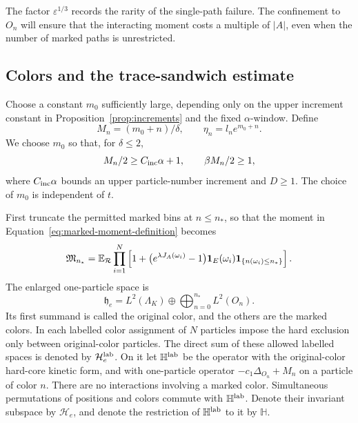 The factor $\varepsilon^{1/3}$ records the rarity of the
single-path failure.  The confinement to $O_n$ will ensure
that the interacting moment costs a multiple of $|A|$,
even when the number of marked paths is unrestricted.

\subsection{Colors and the trace-sandwich estimate}

Choose a constant $m_0$ sufficiently large, depending only
on the upper increment constant in Proposition~\ref{prop:increments}
and the fixed $\alpha$-window.  Define
\begin{equation}\label{eq:color-gaps}
 M_n=(m_0+n)/\delta,\qquad \eta_n=l_n e^{m_0+n}.
\end{equation}
We choose $m_0$ so that, for $\delta\le2$,
\begin{equation}\label{eq:gap-choice}
 M_n/2\ge C_{\rm inc}\alpha+1,
 \qquad \beta M_n/2\ge1,
\end{equation}
where $C_{\rm inc}\alpha$ bounds an upper particle-number
increment and $D\ge1$.  The choice of $m_0$ is independent
of $t$.

First truncate the permitted marked bins at $n\le n_*$, so that the
moment in Equation~\eqref{eq:marked-moment-definition} becomes
\[
 \mathfrak M_{n_*}
 =\mathbb E_{\mathcal R}\prod_{i=1}^N
 \left[1+\bigl(e^{\lambda J_A(\omega_i)}-1\bigr)
       \mathbf 1_E(\omega_i)\mathbf 1_{\{n(\omega_i)\le n_*\}}\right].
\]
The enlarged one-particle space is
\[
 \mathfrak h_e=L^2(\Lambda_K)
               \oplus\bigoplus_{n=0}^{n_*}L^2(O_n).
\]
Its first summand is called the original color, and the
others are the marked colors.  In each labelled color
assignment of $N$ particles impose the hard exclusion
only between original-color particles.  The direct sum
of these allowed labelled spaces is denoted by
$\mathcal H_e^{\rm lab}$.  On it let $\mathbb H^{\rm lab}$
be the operator with the original-color hard-core kinetic
form, and with one-particle operator
$-c_1\Delta_{O_n}+M_n$ on a particle of color $n$.
There are no interactions involving a marked color.
Simultaneous permutations of positions and colors commute
with $\mathbb H^{\rm lab}$.  Denote their invariant
subspace by $\mathcal H_e$, and denote the restriction
of $\mathbb H^{\rm lab}$ to it by $\mathbb H$.

